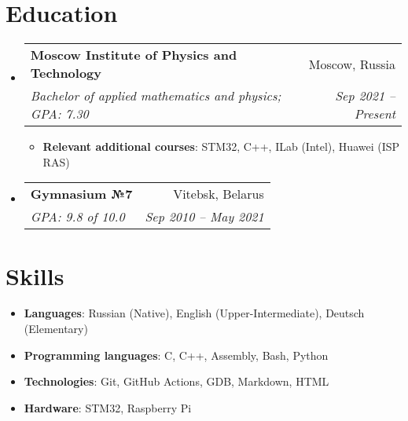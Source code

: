 \documentclass{resume}
\makeatletter
\newcommand{\resumeItem}[2]{
  \item\small{
    \textbf{#1}{: #2 \vspace{-2pt}}
  }
}
\newcommand{\resumeSubheading}[4]{
  \vspace{-1pt}\item
    \begin{tabular*}{0.97\textwidth}[t]{l@{\extracolsep{\fill}}r}
      \textbf{#1} & #2 \\
      \textit{\small#3} & \textit{\small #4} \\
    \end{tabular*}\vspace{-5pt}
}
\newcommand{\resumeSubHeadingListStart}{\begin{itemize}[leftmargin=*]}
\newcommand{\resumeSubHeadingListEnd}{\end{itemize}}
\newcommand{\resumeItemListStart}{\begin{itemize}}
\newcommand{\resumeItemListEnd}{\end{itemize}\vspace{-5pt}}
\makeatother
\begin{document}
\section{Education}
  \resumeSubHeadingListStart
    \resumeSubheading
      {Moscow Institute of Physics and Technology}{Moscow, Russia}
      {Bachelor of applied mathematics and physics;  GPA: 7.30}{Sep 2021 -- Present}
      \resumeItemListStart
      \medskip
      \resumeItem{Relevant additional courses} {STM32, C++, ILab (Intel), Huawei (ISP RAS)}
      \resumeItemListEnd
      \bigskip
      
      \resumeSubheading
        {Gymnasium №7}{Vitebsk, Belarus}{GPA: 9.8 of 10.0}{Sep 2010 -- May 2021}
  \resumeSubHeadingListEnd

\section{Skills}
 \resumeSubHeadingListStart
    \item{
    \textbf{Languages}{: Russian (Native), English (Upper-Intermediate), Deutsch (Elementary)}
    }
    \smallskip
   \item{
     \textbf{Programming languages}{: C, C++, Assembly, Bash, Python}
   }
   \smallskip
   \item{\textbf{Technologies}{: Git, GitHub Actions, GDB, Markdown, HTML}
   }
   \smallskip
   \item{\textbf{Hardware}{: STM32, Raspberry Pi}
   }
 \resumeSubHeadingListEnd
\end{document}
